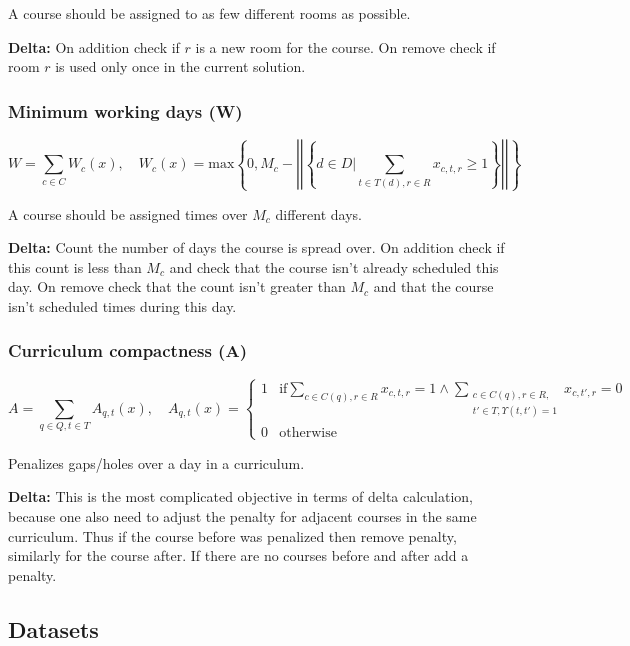 A course should be assigned to as few different rooms as possible.

\textbf{Delta: } On addition check if $r$ is a new room for the course. On remove check if room $r$ is used only once in the current solution.

\subsubsection{Minimum working days (W)}
\begin{equation*}
W = \sum_{c \in C} W_c(x), \quad W_c(x) = \mathrm{max}\left\{ 0, M_c - \left|\left| \left\{ d \in D \Big\vert \sum_{t \in T(d), r \in R} x_{c, t, r} \ge 1 \right\} \right|\right| \right\}
\end{equation*}

A course should be assigned times over $M_c$ different days.

\textbf{Delta: } Count the number of days the course is spread over. On addition check if this count is less than $M_c$ and check that the course isn't already scheduled this day. On remove check that the count isn't greater than $M_c$ and that the course isn't scheduled times during this day.

\subsubsection{Curriculum compactness (A)}
\begin{equation*}
A = \sum_{q \in Q, t \in T} A_{q, t}(x), \quad A_{q, t}(x) = \begin{cases}
1 & \text{if} \displaystyle \sum_{c \in C(q), r \in R} x_{c, t, r} = 1 \wedge \sum_{\substack{c \in C(q), r \in R,\\ t' \in T, \Upsilon(t, t')  = 1}} x_{c, t', r} = 0 \\
0 & \text{otherwise}
\end{cases}
\end{equation*}

Penalizes gaps/holes over a day in a curriculum.

\textbf{Delta: } This is the most complicated objective in terms of delta calculation, because one also need to adjust the penalty for adjacent courses in the same curriculum. Thus if the course before was penalized then remove penalty, similarly for the course after. If there are no courses before and after add a penalty.

\subsection{Datasets}

